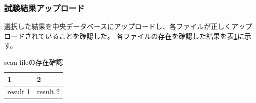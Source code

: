 \subsubsection{試験結果アップロード}
選択した結果を中央データベースにアップロードし、各ファイルが正しくアップロードされていることを確認した。
各ファイルの存在を確認した結果を表\ref{scan_upload_pd}に示す。

\begin{table}[tbp]
\begin{center}
\caption[scan fileの存在確認]{scan fileの存在確認}
\label{scan_upload_pd}
  \begin{tabular}{|ll|} \hline
    1 & 2 \\ \hline
    result 1 & result 2 \\ \hline 
  \end{tabular}
\end{center}
\end{table}

